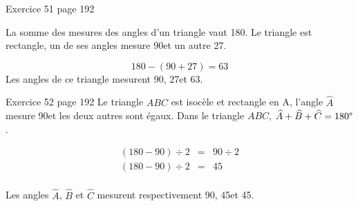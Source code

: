 \documentclass[xcolor={dvipsnames}]{beamer}
\begin{document}
\begin{frame}
	
	\begin{block}{Exercice 51 page 192}
		
		La somme des mesures des angles d'un triangle vaut 180\degree. \pause  
		Le triangle est rectangle, un de ses angles mesure 90\degree et un autre 27\degree. \pause
		
		
		\begin{equation*}
			180 - (90 + 27) = 63
		\end{equation*}
%		
		Les angles de ce triangle mesurent 90\degree, 27\degree et 63\degree. \pause
	\end{block}
	
	\begin{block}{Exercice 52 page 192}
		Le triangle $ABC$ est isocèle et rectangle en A, \pause l'angle $\widehat{A}$ mesure 90\degree et les deux autres sont égaux.
		Dans le triangle $ABC$, $\widehat{A} + \widehat{B} + \widehat{C} = 180\degree$.\pause %
		
		\vspace*{-0.5cm}
		\begin{eqnarray*}
			(180 - 90) \div 2 &=& 90 \div 2\\
			(180 - 90) \div 2 &=& 45\\
		\end{eqnarray*}
		\vspace*{-0.75cm}
		
		Les angles $\widehat{A}$, $\widehat{B}$ et $\widehat{C}$ mesurent respectivement 90\degree, 45\degree et 45\degree.%
	\end{block}
	
	
	
\end{frame}
\end{document}
